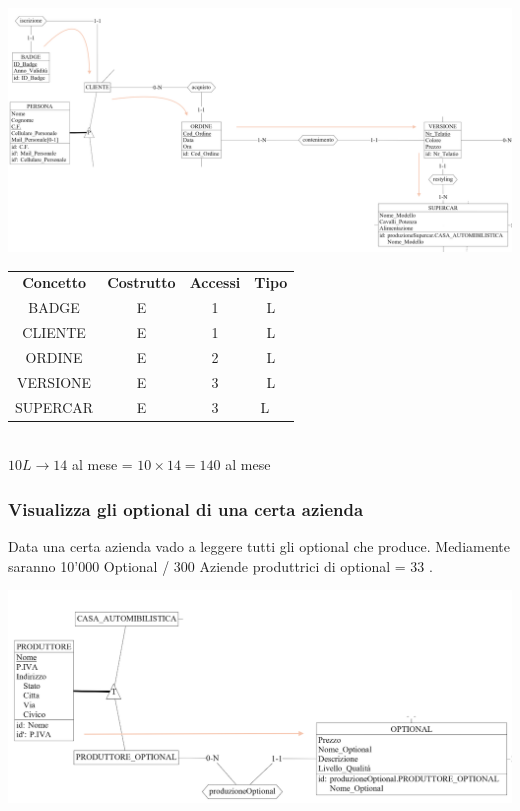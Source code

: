 \documentclass[12pt]{article}
\begin{document}
\begin{center}
    \includegraphics[scale=0.40]{images/acquistiCliente.png}
\end{center}

\begin{table}[H]
    \centering
    \begin{tabular}{ c c c c }
        \rowcolor{red!20!}
        \textbf{Concetto} & \textbf{Costrutto}  & \textbf{Accessi} &
        \textbf{Tipo}\\ 
        BADGE & E & 1 & L \\ 
        CLIENTE & E & 1 & L \\ 
        ORDINE & E & 2 & L \\ 
        VERSIONE & E & 3 & L \\ 
        SUPERCAR & E & 3 & L \ \end{tabular}\\
        \( 10L  \rightarrow 14 \) al mese = \( 10 \times 14 = 140 \) al mese
\end{table}

\subsubsection{Visualizza gli optional di una certa azienda} \label{Visualizza
gli optional di una certa azienda}

Data una certa azienda vado a leggere tutti gli optional che produce. Mediamente
saranno 10'000 Optional / 300 Aziende produttrici di optional = 33 .

\begin{center}
    \includegraphics[scale=0.50]{images/optionalProduttore.png}
\end{center}
\end{document}
